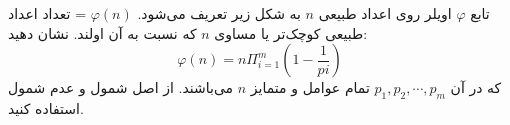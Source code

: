 \EXERCISE
تابع
$\varphi$
اویلر روی اعداد طبیعی
$n$
به شکل زیر تعریف می‌شود.
$\varphi(n)$
= تعداد اعداد طبیعی کوچک‌تر یا مساوی
$n$
که نسبت به آن اولند. نشان دهید:
$$\varphi(n) = n \Pi_{i=1}^{m}(1 - \frac{1}{pi})$$
که در آن
$p_1, p_2, \cdots, p_m$
تمام عوامل و متمایز
$n$
می‌باشند. از اصل شمول و عدم شمول استفاده کنید.